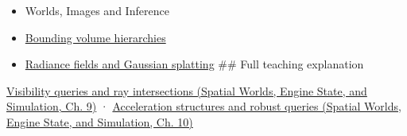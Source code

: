 \begin{itemize}
\item
  {Worlds, Images and Inference}
\item
  \hyperref[appendix-0b426c47dd78]{Bounding volume hierarchies}
\item
  \hyperref[appendix-c5b332e400e7]{Radiance fields and Gaussian splatting} \#\# Full teaching explanation
\end{itemize}

\href{../05-Spatial-Worlds-Engine-State-and-Simulation/main.pdf\#nameddest=04-visual-computing-ii-ch028-visibility-queries-and-ray-intersections-1}{Visibility queries and ray intersections (Spatial Worlds, Engine State, and Simulation, Ch. 9)} · \href{../05-Spatial-Worlds-Engine-State-and-Simulation/main.pdf\#nameddest=04-visual-computing-ii-ch029-acceleration-structures-and-robust-queries-1}{Acceleration structures and robust queries (Spatial Worlds, Engine State, and Simulation, Ch. 10)}
